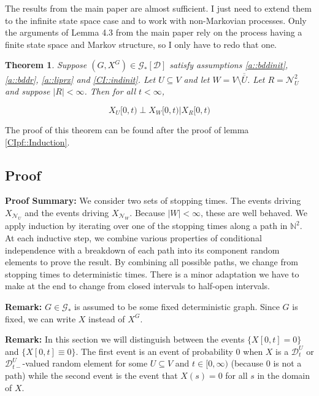 \documentclass[12pt]{article}
\newcommand{\skipLine}{\vspace{12pt}}
\newcommand{\mb}{\mathbb}
\newcommand{\mc}{\mathcal}
\newcommand{\ov}{\overline}
\newcommand{\pfsum}{\textbf{Proof Summary: }}
\newcommand{\remark}{\textbf{Remark: }}
\newcommand{\cad}{\mc{D}}							%
\newcommand{\neigh}[1]{\mc{N}_{#1}}					%
\newcommand{\dneigh}[1]{\mc{N}^2_{#1}}				%
\newcommand{\Xf}{X}									%
\newcommand{\vind}[1]{_{#1}}						%
\newcommand{\tme}[1]{(#1)}							%
\newcommand{\tmi}[1]{#1}							%
\newcommand{\gind}[1]{^{#1}}						%
\newcommand{\vpara}[1]{^{#1}}						%
\newcommand{\tpara}[1]{_{#1}}						%
\newcommand{\Gs}{\mc{G}_\ast}						%
\renewcommand{\sp}[1]{[#1]}							%
\newcommand{\seto}{U}								%
\newcommand{\sett}{W}								%
\newcommand{\setc}{R}								%
\newtheorem{thms}{Theorem}[section]
\begin{document}
The results from the main paper are almost sufficient. I just need to extend them to the infinite state space case and to work with non-Markovian processes. Only the arguments of Lemma 4.3 from the main paper rely on the process having a finite state space and Markov structure, so I only have to redo that one.

\begin{thms}
Suppose \((G,\Xf\gind{G})\in \Gs\sp{\cad}\) satisfy assumptions \ref{a::bddinit},\ref{a::bddr}, \ref{a::liprx} and \ref{CI::indinit}. Let \(\seto \subseteq V\) and let \(\sett = V\setminus \ov{\ov{\seto}}\). Let \(\setc = \dneigh{\seto}\) and suppose \(|\setc| < \infty\). Then for all \(t < \infty\),

\begin{equation}
\Xf\vind{\seto}\tmi{[0,t)}\perp \Xf\vind{\sett}\tmi{[0,t)}|\Xf\vind{\setc}\tmi{[0,t)}
\label{CI::CIeqn}
\end{equation}

\label{CI::CI}
\end{thms}

The proof of this theorem can be found after the proof of lemma \ref{CIpf::Induction}.

\subsection{Proof}
\label{CI::CIpf}

\pfsum We consider two sets of stopping times. The events driving \(\Xf\vind{\neigh{\seto}}\) and the events driving \(\Xf\vind{\neigh{\sett}}\). Because \(|\sett| < \infty\), these are well behaved. We apply induction by iterating over one of the stopping times along a path in \(\mb{N}^2\). At each inductive step, we combine various properties of conditional independence with a breakdown of each path into its component random elements to prove the result. By combining all possible paths, we change from stopping times to deterministic times. There is a minor adaptation we have to make at the end to change from closed intervals to half-open intervals.

\skipLine

\remark \(G\in \Gs\) is assumed to be some fixed deterministic graph. Since \(G\) is fixed, we can write \(\Xf\) instead of \(\Xf\gind{G}\).

\skipLine

\remark In this section we will distinguish between the events \(\{\Xf\tmi{[0,t]} = 0\}\) and \(\{\Xf\tmi{[0,t]}\equiv 0\}\). The first event is an event of probability 0 when \(\Xf\) is a \(\cad\vpara{\seto}\tpara{t}\) or \(\cad\vpara{\seto}\tpara{t-}\)-valued random element for some \(\seto\subseteq V\) and \(t \in [0,\infty)\) (because 0 is not a path) while the second event is the event that \(\Xf\tme{s} = 0\) for all \(s\) in the domain of \(\Xf\).
\end{document}
